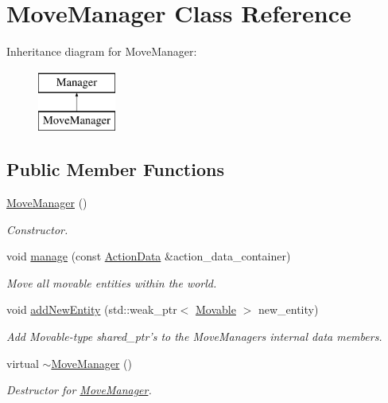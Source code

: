 \hypertarget{class_move_manager}{\section{Move\+Manager Class Reference}
\label{class_move_manager}
}
Inheritance diagram for Move\+Manager\+:\begin{figure}[H]
\begin{center}
\leavevmode
\includegraphics[height=2.000000cm]{class_move_manager}
\end{center}
\end{figure}
\subsection*{Public Member Functions}
\begin{DoxyCompactItemize}
\item 
\hyperlink{class_move_manager_a57ac62af15a2d9f9ed9b9ae96ea7900f}{Move\+Manager} ()
\begin{DoxyCompactList}\small\item\em Constructor. \end{DoxyCompactList}\item 
\hypertarget{class_move_manager_a1e21cd4f542f801e84b57fd5f11f1154}{void \hyperlink{class_move_manager_a1e21cd4f542f801e84b57fd5f11f1154}{manage} (const \hyperlink{class_action_data}{Action\+Data} \&action\+\_\+data\+\_\+container)}\label{class_move_manager_a1e21cd4f542f801e84b57fd5f11f1154}

\begin{DoxyCompactList}\small\item\em Move all movable entities within the world. \end{DoxyCompactList}\item 
\hypertarget{class_move_manager_a9f49f128a880d4f94c529c6aafab880e}{void \hyperlink{class_move_manager_a9f49f128a880d4f94c529c6aafab880e}{add\+New\+Entity} (std\+::weak\+\_\+ptr$<$ \hyperlink{class_movable}{Movable} $>$ new\+\_\+entity)}\label{class_move_manager_a9f49f128a880d4f94c529c6aafab880e}

\begin{DoxyCompactList}\small\item\em Add Movable-\/type shared\+\_\+ptr's to the Move\+Managers internal data members. \end{DoxyCompactList}\item 
\hypertarget{class_move_manager_a1de20c7414d1511c5b3a58196a557d94}{virtual \hyperlink{class_move_manager_a1de20c7414d1511c5b3a58196a557d94}{$\sim$\+Move\+Manager} ()}\label{class_move_manager_a1de20c7414d1511c5b3a58196a557d94}

\begin{DoxyCompactList}\small\item\em Destructor for \hyperlink{class_move_manager}{Move\+Manager}. \end{DoxyCompactList}\end{DoxyCompactItemize}


